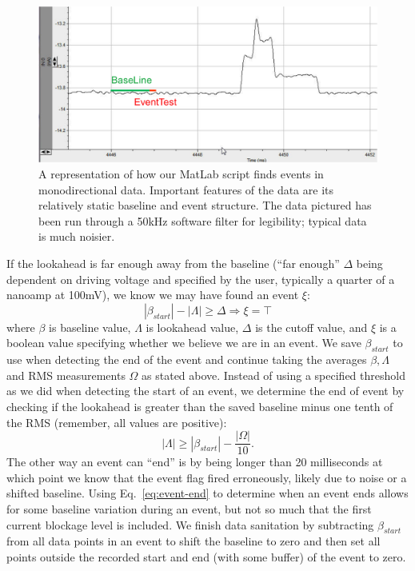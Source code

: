 \documentclass[aps,prl,preprint,groupedaddress]{revtex4}
\begin{document}
\begin{figure}
\centering
\includegraphics[width=1\textwidth]{figures/find-events}
\caption{A representation of how our MatLab script finds events in monodirectional data. Important features of the data are its relatively static baseline and event structure. The data pictured has been run through a 50kHz software filter for legibility; typical data is much noisier.}
\label{fig:find-events}
\end{figure}

If the lookahead is far enough away from the baseline (``far enough'' \(\Delta\) being dependent on driving voltage and specified by the user, typically a quarter of a nanoamp at 100mV), we know we may have found an event \(\xi\):
\begin{equation} |\beta_{start}| - |\Lambda| \geq \Delta \Rightarrow \xi = \top \label{eq:event-start}\end{equation}
where \(\beta\) is baseline value, \(\Lambda\) is lookahead value, \(\Delta\) is the cutoff value, and \(\xi\) is a boolean value specifying whether we believe we are in an event.
We save \(\beta_{start}\) to use when detecting the end of the event and continue taking the averages \(\beta, \Lambda\) and RMS measurements \(\Omega\) as stated above.
Instead of using a specified threshold as we did when detecting the start of an event, we determine the end of event by checking if the lookahead is greater than the saved baseline minus one tenth of the RMS (remember, all values are positive):
\begin{equation}|\Lambda| \geq |\beta_{start}| - \frac{|\Omega|}{10}. \label{eq:event-end}\end{equation}
The other way an event can ``end'' is by being longer than 20 milliseconds at which point we know that the event flag fired erroneously, likely due to noise or a shifted baseline.
Using Eq.~\ref{eq:event-end} to determine when an event ends allows for some baseline variation during an event, but not so much that the first current blockage level is included.
We finish data sanitation by subtracting \(\beta_{start}\) from all data points in an event to shift the baseline to zero and then set all points outside the recorded start and end (with some buffer) of the event to zero.
\end{document}
